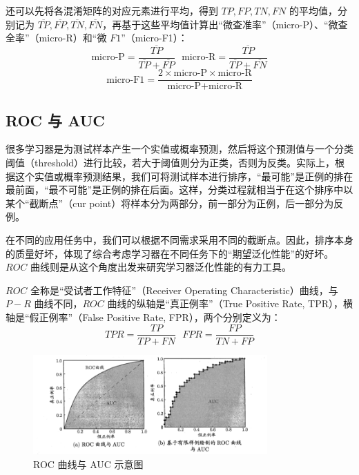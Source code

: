 \documentclass[12pt, a4paper]{article} %
\begin{document}
还可以先将各混淆矩阵的对应元素进行平均，得到 $TP, FP, TN, FN$ 的平均值，分别记为 $\overline {TP}, \overline{FP}, \overline{TN}, \overline{FN}$，再基于这些平均值计算出“微查准率”（micro-P）、“微查全率”（micro-R）和“微 $F1$”（micro-F1）：
\begin{equation*}
    \text{micro-P} = \frac{\overline{TP}}{\overline{TP} + \overline{FP}} \ \ \ \text{micro-R} = \frac{\overline{TP}}{\overline{TP} + \overline{FN}}
\end{equation*}
\begin{equation*}
    \text{micro-F1} = \frac{2 \times \text{micro-P} \times \text{micro-R}}{\text{micro-P} + \text{micro-R}}
\end{equation*}

\subsection{ROC 与 AUC}

很多学习器是为测试样本产生一个实值或概率预测，然后将这个预测值与一个分类阈值（threshold）进行比较，若大于阈值则分为正类，否则为反类。实际上，根据这个实值或概率预测结果，我们可将测试样本进行排序，“最可能”是正例的排在最前面，“最不可能”是正例的排在后面。这样，分类过程就相当于在这个排序中以某个“截断点”（cur point）将样本分为两部分，前一部分为正例，后一部分为反例。

在不同的应用任务中，我们可以根据不同需求采用不同的截断点。因此，排序本身的质量好坏，体现了综合考虑学习器在不同任务下的“期望泛化性能”的好坏。$ROC$ 曲线则是从这个角度出发来研究学习器泛化性能的有力工具。

$ROC$ 全称是“受试者工作特征”（Receiver Operating Characteristic）曲线，与 $P-R$ 曲线不同，$ROC$ 曲线的纵轴是“真正例率”（True Positive Rate, TPR），横轴是“假正例率”（False Positive Rate, FPR），两个分别定义为：
\begin{equation*}
    TPR = \frac{TP}{TP + FN} \ \ \ FPR = \frac{FP}{TN + FP}
\end{equation*}

\begin{figure}[H]
    \centering
    \includegraphics[width=0.8\textwidth]{../img/2-4-ROC曲线与AUC.png}
    \caption{ROC 曲线与 AUC 示意图}
    \label{fig:ROC 曲线与 AUC 示意图}
\end{figure}
\end{document}
